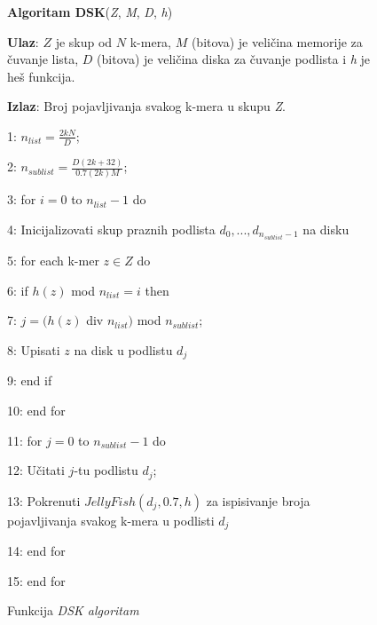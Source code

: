 \documentclass[12pt,oneside]{memoir}
\begin{document}
\begin{comment}

\begin{figure}[h]
\centering
\texttt{[image: DSK5\_11.PNG]}
\caption{DSK algoritam \cite{WingKinSung}}
\label{fig:DSK}
\end{figure}

\end{comment}

\begin{figure}[!ht]
\begin{tcolorbox}
\textbf{Algoritam DSK}(\textit{Z}, \textit{M}, \textit{D}, \textit{h})

\textbf{Ulaz}: $Z$ je skup od $N$ k-mera, $M$ (bitova) je veličina memorije za čuvanje lista, $D$ (bitova) je veličina diska za čuvanje podlista i \textit{h} je heš funkcija.

\textbf{Izlaz}: Broj pojavljivanja svakog k-mera u skupu \textit{Z}.

1: $n_{list} = \frac{2kN}{D}$;

2: $n_{sublist} = \frac{D(2k + 32)}{0.7(2k)M}$;

3: for $i = 0$ to $n_{list} - 1$ do

4:\hspace{1cm} Inicijalizovati skup praznih podlista ${d_0,..., d_{n_{sublist} - 1}}$ na disku

5:\hspace{1cm} for each k-mer $z \in Z$ do

6:\hspace{2cm} if $h(z)$ mod $n_{list} = i$ then

7:\hspace{3cm} $j = (h(z)$ div $n_{list})$ mod $n_{sublist}$;

8:\hspace{3cm} Upisati $z$ na disk u podlistu $d_j$

9:\hspace{2cm} end if

10:\hspace{1cm} end for

11:\hspace{1cm} for $j = 0$ to $n_{sublist} - 1$ do

12:\hspace{2cm} Učitati $j$-tu podlistu $d_j$;

13:\hspace{2cm} Pokrenuti $JellyFish(d_j, 0.7, h)$ za ispisivanje broja pojavljivanja svakog k-mera u podlisti $d_j$

14:\hspace{1cm} end for

15: end for
\end{tcolorbox}
\caption{Funkcija \textit{DSK algoritam} \cite{WingKinSung}}
\label{box:DSK}
\end{figure}
\end{document}
